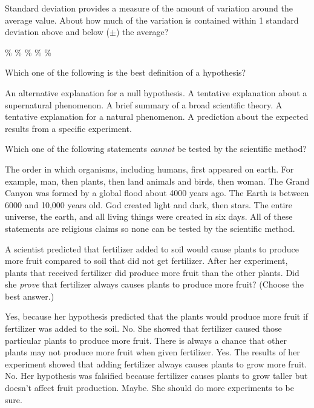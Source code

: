 \question
Standard deviation provides a measure of the amount of variation around the average value. About how much of the variation is contained within 1 standard deviation above and below ($\pm$) the average?

\begin{choices}
\%%
\%%
\%%
\%%
\%%
\end{choices}

\question
Which one of the following is the best definition of a hypothesis?

\begin{choices}
\choice An alternative explanation for a null hypothesis.%
\choice A tentative explanation about a supernatural phenomenon.%
\choice A brief summary of a broad scientific theory.%
\correctchoice A tentative explanation for a natural phenomenon.%
\choice A prediction about the expected results from a specific experiment.%
\end{choices}

\question
Which one of the following statements \emph{cannot} be tested by the scientific method?

\begin{choices}
\choice The order in which organisms, including humans, first appeared on earth. For example, man, then plants, then land animals and birds, then woman.%
\choice The Grand Canyon was formed by a global flood about 4000 years ago.%
\choice The Earth is between 6000 and 10,000 years old.%
\correctchoice God created light and dark, then stars.%
\choice The entire universe, the earth, and all living things were created in six days.%
\choice All of these statements are religious claims so none can be tested by the scientific method.%
\end{choices}

\question
A scientist predicted that fertilizer added to soil would cause plants to produce more fruit compared to soil that did not get fertilizer. After her experiment, plants that received fertilizer did produce more fruit than the other plants. Did she \emph{prove} that fertilizer always causes plants to produce more fruit? (Choose the best answer.)

\begin{choices}
\choice Yes, because her hypothesis predicted that the plants would produce more fruit if fertilizer was added to the soil.%
\correctchoice No. She showed that fertilizer caused those particular plants to produce more fruit. There is always a chance that other plants may not produce more fruit when given fertilizer.%
\choice Yes. The results of her experiment showed that adding fertilizer always causes plants to grow more fruit.%
\choice No. Her hypothesis was falsified because fertilizer causes plants to grow taller but doesn't affect fruit production.%
\choice Maybe. She should do more experiments to be sure.%
\end{choices}

